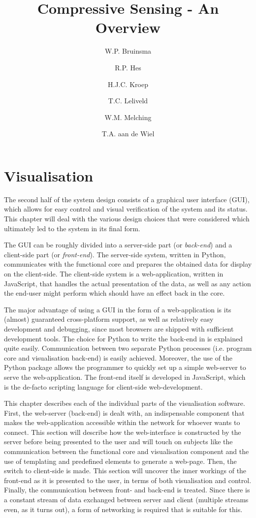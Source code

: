 \documentclass[a4paper, openany, oneside]{memoir}
\title{Compressive Sensing - An Overview}
\author{W.P. Bruinsma \and R.P. Hes \and H.J.C. Kroep \and T.C. Leliveld \and W.M. Melching \and T.A. aan de Wiel}
\begin{document}
\chapter{Visualisation}
\label{ch:visualisation}
The second half of the system design consists of a graphical user interface (GUI), which allows for easy control and visual verification of the system and its status. This chapter will deal with the various design choices that were considered which ultimately led to the system in its final form.

The GUI can be roughly divided into a server-side part (or \emph{back-end}) and a client-side part (or \emph{front-end}). The server-side system, written in Python, communicates with the functional core and prepares the obtained data for display on the client-side. The client-side system is a web-application, written in JavaScript, that handles the actual presentation of the data, as well as any action the end-user might perform which should have an effect back in the core.

The major advantage of using a GUI in the form of a web-application is its (almost) guaranteed cross-platform support, as well as relatively easy development and debugging, since most browsers are shipped with sufficient development tools.
The choice for Python to write the back-end in is explained quite easily. Communication between two separate Python processes (i.e. program core and visualisation back-end) is easily achieved. Moreover, the use of the  Python package allows the programmer to quickly set up a simple web-server to serve the web-application.
The front-end itself is developed in JavaScript, which is the de-facto scripting language for client-side web-development.

This chapter describes each of the individual parts of the visualisation software.
First, the web-server (back-end) is dealt with, an indispensable component that makes the web-application accessible within the network for whoever wants to connect. This section will describe how the web-interface is constructed by the server before being presented to the user and will touch on subjects like the communication between the functional core and visualisation component and the use of templating and predefined elements to generate a web-page.
Then, the switch to client-side is made. This section will uncover the inner workings of the front-end as it is presented to the user, in terms of both visualisation and control.
Finally, the communication between front- and back-end is treated. Since there is a constant stream of data exchanged between server and client (multiple streams even, as it turns out), a form of networking is required that is suitable for this.
\end{document}
